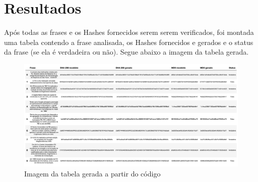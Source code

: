 \chapter{Resultados} \label{resultados}

Após todas as frases e os Hashes fornecidos serem serem verificados, foi montada 
uma tabela contendo a frase analisada, os Hashes fornecidos e gerados e o status 
da frase (se ela é verdadeira ou não). Segue abaixo a imagem da tabela gerada.

\begin{figure}[H]
  \centering
  \includegraphics[scale=0.17]{../../tabela.png}
  \caption{Imagem da tabela gerada a partir do código}
  \label{table} 
\end{figure}